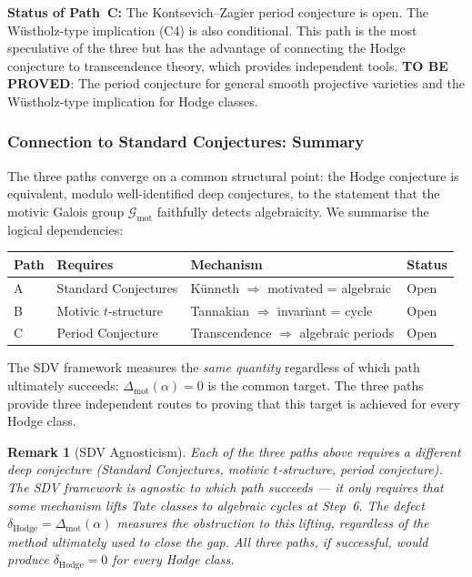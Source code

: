 \documentclass[11pt]{article}
\newtheorem{remark}[theorem]{Remark}
\theoremstyle{definition}
\begin{document}
\noindent
\textbf{Status of Path~C:} The Kontsevich--Zagier period conjecture is
open.  The W\"ustholz-type implication (C4) is also conditional.  This
path is the most speculative of the three but has the advantage of
connecting the Hodge conjecture to transcendence theory, which provides
independent tools.
\textbf{TO BE PROVED}: The period conjecture for general smooth projective
varieties and the W\"ustholz-type implication for Hodge classes.

\subsubsection{Connection to Standard Conjectures: Summary}
\label{sec:standard-summary}

The three paths converge on a common structural point: the Hodge conjecture
is equivalent, modulo well-identified deep conjectures, to the statement
that the motivic Galois group $\mathcal{G}_{\mathrm{mot}}$ faithfully
detects algebraicity.  We summarise the logical dependencies:

\begin{center}
\begin{tabular}{llll}
\hline
\textbf{Path} & \textbf{Requires} & \textbf{Mechanism} & \textbf{Status} \\
\hline
A & Standard Conjectures & K\"unneth $\Rightarrow$ motivated = algebraic & Open \\
B & Motivic $t$-structure & Tannakian $\Rightarrow$ invariant = cycle & Open \\
C & Period Conjecture & Transcendence $\Rightarrow$ algebraic periods & Open \\
\hline
\end{tabular}
\end{center}

\noindent
The SDV framework measures the \emph{same quantity} regardless of which path
ultimately succeeds: $\Delta_{\mathrm{mot}}(\alpha) = 0$ is the common target.
The three paths provide three independent routes to proving that this target is
achieved for every Hodge class.

\begin{remark}[SDV Agnosticism]
\label{rem:sdv-agnostic}
Each of the three paths above requires a different deep conjecture (Standard
Conjectures, motivic $t$-structure, period conjecture).  The SDV framework is
agnostic to which path succeeds --- it only requires that \emph{some} mechanism
lifts Tate classes to algebraic cycles at Step~6.  The defect
$\delta_{\mathrm{Hodge}} = \Delta_{\mathrm{mot}}(\alpha)$ measures the
\emph{obstruction} to this lifting, regardless of the method ultimately used
to close the gap.  All three paths, if successful, would produce
$\delta_{\mathrm{Hodge}} = 0$ for every Hodge class.
\end{remark}
\end{document}

